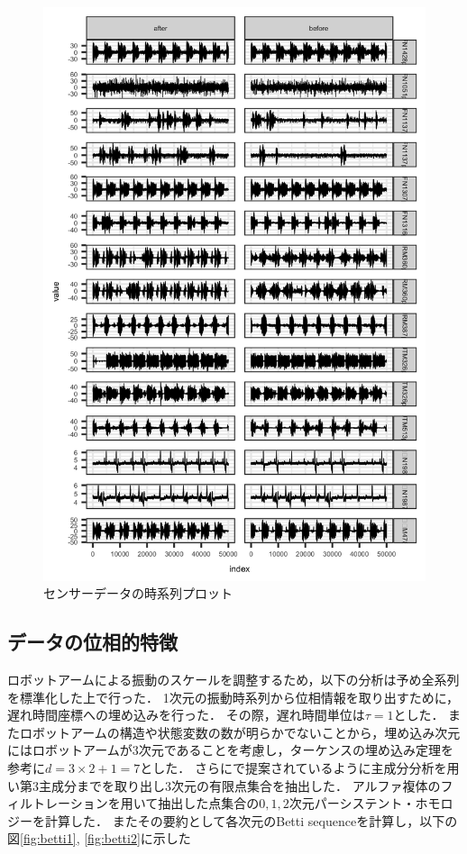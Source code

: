 \documentclass{jarticle}
\begin{document}
\begin{figure}[htbp]
\begin{center}
	\includegraphics[width=12cm]{fig/ts.png}	
	\caption{センサーデータの時系列プロット\label{fig:ts}}
\end{center}
\end{figure}

\subsection{データの位相的特徴}
ロボットアームによる振動のスケールを調整するため，以下の分析は予め全系列を標準化した上で行った．
1次元の振動時系列から位相情報を取り出すために，遅れ時間座標への埋め込みを行った．
その際，遅れ時間単位は$\tau = 1$とした．
またロボットアームの構造や状態変数の数が明らかでないことから，埋め込み次元にはロボットアームが3次元であることを考慮し，ターケンスの埋め込み定理を参考に$d = 3\times2 + 1 = 7$とした．
さらに\cite{Truong2017}で提案されているように主成分分析を用い第3主成分までを取り出し3次元の有限点集合を抽出した．
アルファ複体のフィルトレーションを用いて抽出した点集合の$0,1,2$次元パーシステント・ホモロジーを計算した．
またその要約として各次元のBetti sequenceを計算し，以下の図\ref{fig:betti1}, \ref{fig:betti2}に示した
\end{document}
